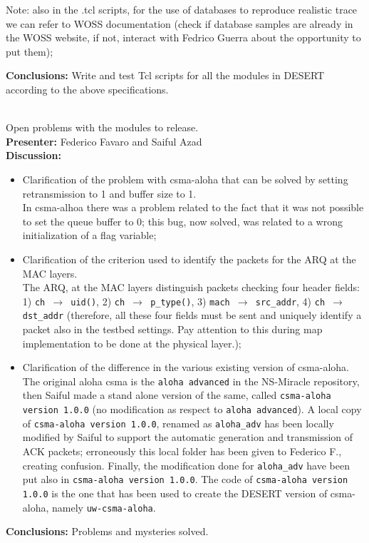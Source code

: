 \documentclass[11pt,journal,draftclsnofoot,onecolumn,twoside,letterpaper]{IEEEtran}
\theoremstyle{definition} \newtheorem{definition}[]{Definition}
\theoremstyle{theorem} \newtheorem{theorem}[]{Theorem}
\begin{document}
Note: also in the .tcl scripts, for the use of databases to reproduce realistic trace we can refer to WOSS documentation (check if database samples are already in the WOSS website, if not, interact with Fedrico Guerra about the opportunity to put them);


{\bf Conclusions:}  Write and test Tcl scripts for all the modules in DESERT according to the above specifications. 


\  \\
 Open problems with the modules to release.\\
{\bf Presenter:} Federico Favaro and Saiful Azad\\
{\bf Discussion:} \\
\begin{itemize}
 \item Clarification of the problem with csma-aloha that can be solved by setting retransmission to 1 and buffer size to 1.\\
  In csma-alhoa there was a problem related to the fact that it was not possible to set the queue buffer to 0; this bug, now solved, was related to a wrong initialization of a flag variable;
 \item Clarification of the criterion used to identify the packets for the ARQ at the MAC layers.\\
  The ARQ, at the MAC layers distinguish packets checking four header fields: 1) {\tt ch $\rightarrow$ uid()}, 2) {\tt ch $\rightarrow$ p\_type()}, 3) {\tt mach $\rightarrow$ src\_addr}, 4) {\tt ch $\rightarrow$ dst\_addr} (therefore, all these four fields must be sent and uniquely identify a packet also in the testbed settings. Pay attention to this during map implementation to be done at the physical layer.);
 \item Clarification of the difference in the various existing version of csma-aloha.\\  
       The original aloha csma is the {\tt aloha advanced} in the NS-Miracle repository, then Saiful made a stand alone version of the same, called {\tt csma-aloha version 1.0.0} (no modification as respect to {\tt aloha advanced}). A local copy of {\tt csma-aloha version 1.0.0}, renamed as {\tt aloha\_adv} has been locally modified by Saiful to support the automatic generation and transmission of ACK packets; erroneously this local folder has been given to Federico F., creating confusion. Finally, the modification done for {\tt aloha\_adv} have been put also in {\tt csma-aloha version 1.0.0}. The code of {\tt csma-aloha version 1.0.0} is the one that has been used to create the DESERT version of csma-aloha, namely {\tt uw-csma-aloha}.
\end{itemize}
{\bf Conclusions:} Problems and mysteries solved.
\end{document}
